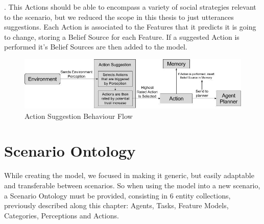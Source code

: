 . This Actions should be able to encompass a variety of social strategies relevant to the scenario, but we reduced the scope in this thesis to just utterances suggestions. Each Action is associated to the Features that it predicts it is going to change, storing a Belief Source for each Feature. If a suggested Action is performed it's Belief Sources are then added to the model. 



\begin{figure}[hbt]
    \centering
    \includegraphics[width=\textwidth]{figures/ActionSuggestionDiagram.jpg}
    \caption{Action Suggestion Behaviour Flow}
    \label{fig:ActionSuggestionDiagram}
\end{figure}


\section{Scenario Ontology}
While creating the model, we focused in making it generic, but easily adaptable and transferable between scenarios. So when using the model into a new scenario, a Scenario Ontology must be provided, consisting in 6 entity collections, previously described along this chapter: Agents, Tasks, Feature Models, Categories, Perceptions and Actions.
